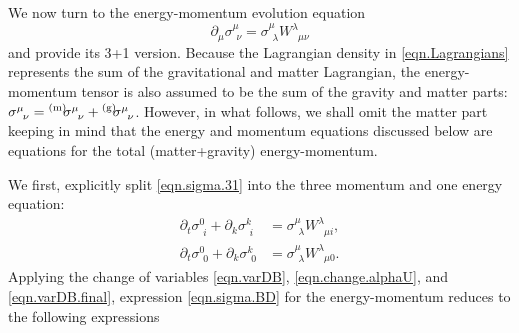 \documentclass[
10pt, %
a4paper, %
oneside, %
twocolumn,
headinclude,footinclude, %
BCOR5mm, %
]{scrartcl}
\newcommand{\pd}[1]{\partial_{#1}}
\newcommand{\w}[2]{W^{#1}_{\phantom{#1}#2}}
\newcommand{\EMmat}[2]{\sigma^{#1}_{\ \,#2}}
\newcommand{\mat}[1]{\prescript{\text{(m)}}{}{\hspace{-0.1cm}#1}}
\newcommand{\gra}[1]{\prescript{\text{(g)}}{}{\hspace{-0.1cm}#1}}
\begin{document}
	We now turn to the energy-momentum evolution equation
	\begin{equation}\label{eqn.sigma.31}
		\pd{\mu}\EMmat{\mu}{\nu} 
		= \EMmat{\mu}{\lambda} 
		\w{\lambda}{\mu\nu}
	\end{equation}
	and provide its 3+1 version. Because the Lagrangian density in \eqref{eqn.Lagrangians} 
	represents the sum of the gravitational and matter Lagrangian, the energy-momentum tensor is 
	also 
	assumed to be the sum of the gravity and matter parts: $ \EMmat{\mu}{\nu} = 
	\mat{\EMmat{\mu}{\nu}} 
	+ 
	\gra{\EMmat{\mu}{\nu}} $. However, in what follows, we shall omit the matter part keeping in 
	mind 
	that the energy and momentum equations discussed below are equations for the total 
	(matter+gravity) 
	energy-momentum. 
	
	We first, explicitly split \eqref{eqn.sigma.31} into the three momentum and one energy equation:
	\begin{subequations}\label{eqn.EM.sigma}
		\begin{align}
			\pd{t}\EMmat{0}{i} + \pd{k}\EMmat{k}{i}
			& = \EMmat{\mu}{\lambda} 
			\w{\lambda}{\mu i},\\[2mm]
			\pd{t}\EMmat{0}{0} + \pd{k}\EMmat{k}{0}
			& = \EMmat{\mu}{\lambda} 
			\w{\lambda}{\mu 0}.
		\end{align}
	\end{subequations}
	Applying the change of variables \eqref{eqn.varDB}, \eqref{eqn.change.alphaU}, and 
	\eqref{eqn.varDB.final}, expression \eqref{eqn.sigma.BD} for the energy-momentum reduces to the 
	following expressions
\end{document}
